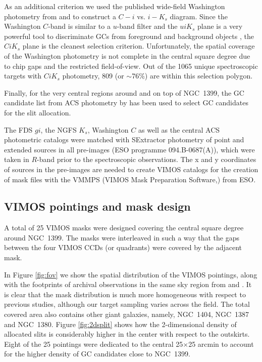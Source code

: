 \documentclass[useAMS,usenatbib]{mn2e}
\begin{document}
As an additional criterion we used the published wide-field Washington photometry from \citet{Dirsch04} and \citet{Bassino} to construct a $C-i$ vs. $i-K_s$ diagram. Since the Washington $C$-band is similar to a $u$-band filter and the $uiK_s$ plane is a very powerful tool to discriminate GCs from foreground and background objects \citep{Munoz14}, the $CiK_s$ plane is the cleanest selection criterion. Unfortunately, the spatial coverage of the Washington photometry is not complete in the central square degree due to chip gaps and the restricted field-of-view. 
Out of the 1065 unique spectroscopic targets with $CiK_s$ photometry, 809 (or $\sim$76\%) are within this selection polygon.

Finally, for the very central regions around and on top of NGC~1399, the GC candidate list from ACS photometry by \citet{Puzia14} has been used to select GC candidates for the slit allocation.

The FDS $gi$, the NGFS $K_s$, Washington $C$ as well as the central ACS  photometric catalogs were matched with SExtractor photometry of point and extended sources in all pre-images (ESO programme 094.B-0687(A)), which were taken in $R$-band prior to the spectroscopic observations. The x and y coordinates of sources in the pre-images are needed to create VIMOS catalogs for the creation of mask files with the VMMPS (VIMOS Mask Preparation Software,\citealt{Bottini05}) from ESO.

\subsection{VIMOS pointings and mask design}
\label{sec:VIMOSpointings}

A total of 25 VIMOS masks were designed covering the central square degree around NGC~1399. The masks were interleaved in such a way that the gaps between the four VIMOS CCDs (or quadrants) were covered by the adjacent mask. 

In Figure \ref{fig:fov} we show the spatial distribution of the VIMOS pointings, along with the footprints of archival observations in the same sky region from \citet{Schuberth} and \citet{Bergond07}. It is clear that the mask distribution is much more homogeneous with respect to previous studies, although our target sampling varies across the field. The total covered area also contains other giant galaxies, namely, NGC~1404, NGC~1387 and NGC~1380.  
Figure \ref{fig:2dsplit} shows how the 2-dimensional density of allocated slits is considerably higher in the center with respect to the outskirts. Eight of the 25 pointings were dedicated to the central 25$\times$25 arcmin to account for the higher density of GC candidates close to NGC~1399. 
\end{document}
